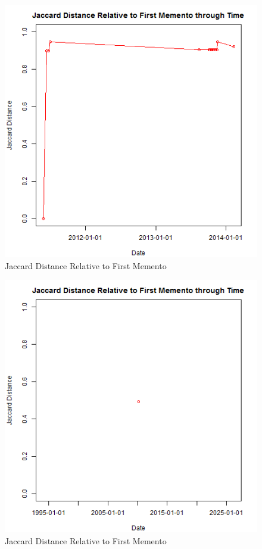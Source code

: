 \documentclass[12pt]{Report}
\begin{document}
 
 \begin{figure}[ht]    
    \begin{center}
        \includegraphics[scale=0.60]{link4.png}
        \caption{Jaccard Distance Relative to First Memento }
        \label{Jaccard Distance Relative to First Memento}
    \end{center}
\end{figure}
\newpage


\begin{figure}[ht]    
    \begin{center}
        \includegraphics[scale=0.60]{link5.png}
        \caption{Jaccard Distance Relative to First Memento }
        \label{Jaccard Distance Relative to First Memento}
    \end{center}
\end{figure}
\newpage
\end{document}
